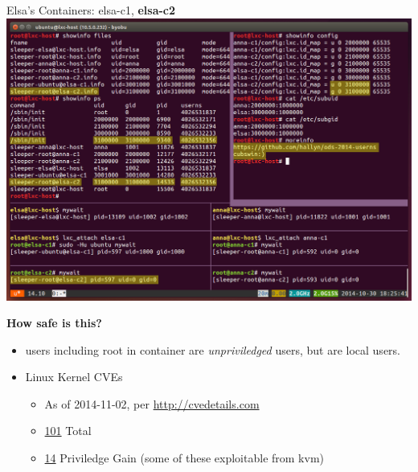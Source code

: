\documentclass{beamer}
\begin{document}
\begin{frame}
Elsa's Containers: elsa-c1, \textbf{elsa-c2}
\includegraphics[width=\textwidth]{screen-elsa-c2.png}
\end{frame}

\begin{frame}
\textbf{How safe is this?}
\begin{itemize}
\item users including root in container are \textit{unpriviledged} users, but are local users.
\item Linux Kernel CVEs
  \begin{itemize}
  \item As of 2014-11-02, per \url{http://cvedetails.com}
  \item \href{http://www.cvedetails.com/vulnerability-list/vendor_id-33/product_id-47/year-2014/Linux-Linux-Kernel.html}{101} Total
  \item \href{http://www.cvedetails.com/vulnerability-list/vendor_id-33/product_id-47/year-2014/opgpriv-1/Linux-Linux-Kernel.html}{14} Priviledge Gain (some of these exploitable from kvm)
  \end{itemize}
\end{itemize}
\end{frame}
\end{document}
